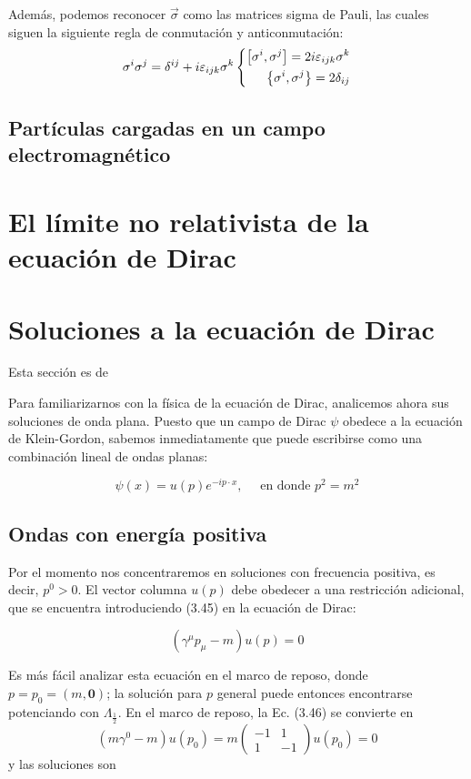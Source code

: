 Además, podemos reconocer $\vec{\sigma}$ como las matrices sigma de Pauli, las cuales siguen la siguiente regla de conmutación y anticonmutación:
\[\sigma^{i}\sigma^{j}=\delta^{ij}+i\varepsilon_{ijk}\sigma^{k}\left\{\begin{align}
  \comm{\sigma^{i}}{\sigma^{j}}=2i\varepsilon_{ijk}\sigma^{k} \\
  \acomm{\sigma^{i}}{\sigma^{j}}=2\delta_{ij} 
\end{align}\right.\]
\subsection{Partículas cargadas en un campo electromagnético}

\section{El límite no relativista de la ecuación de Dirac}

\section{Soluciones a la ecuación de Dirac}
\begin{center}
  \large Esta sección es de \cite{peskin_schroeder_1995}
\end{center}
Para familiarizarnos con la física de la ecuación de Dirac, analicemos ahora sus soluciones de onda plana. Puesto que un campo de Dirac $\psi$ obedece a la ecuación de Klein-Gordon, sabemos inmediatamente que puede escribirse como una combinación lineal de ondas planas:

\begin{equation*}
\psi(x)=u(p) e^{-i p \cdot x}, \quad \text { en donde } p^{2}=m^{2} \tag{3.45}
\end{equation*}

\subsection{Ondas con energía positiva}
Por el momento nos concentraremos en soluciones con frecuencia positiva, es decir, $p^{0}>0$. El vector columna $u(p)$ debe obedecer a una restricción adicional, que se encuentra introduciendo (3.45) en la ecuación de Dirac:

\begin{equation*}
\left(\gamma^{\mu} p_{\mu}-m\right) u(p)=0 \tag{3.46}
\end{equation*}


Es más fácil analizar esta ecuación en el marco de reposo, donde $p=p_{0}=(m, \mathbf{0})$; la solución para $p$ general puede entonces encontrarse potenciando con $\Lambda_{\frac{1}{2}}$. En el marco de reposo, la Ec. (3.46) se convierte en
$$
\left(m \gamma^{0}-m\right) u\left(p_{0}\right)=m\left(\begin{array}{rr}
-1 & 1 \\
1 & -1
\end{array}\right) u\left(p_{0}\right)=0
$$
y las soluciones son

